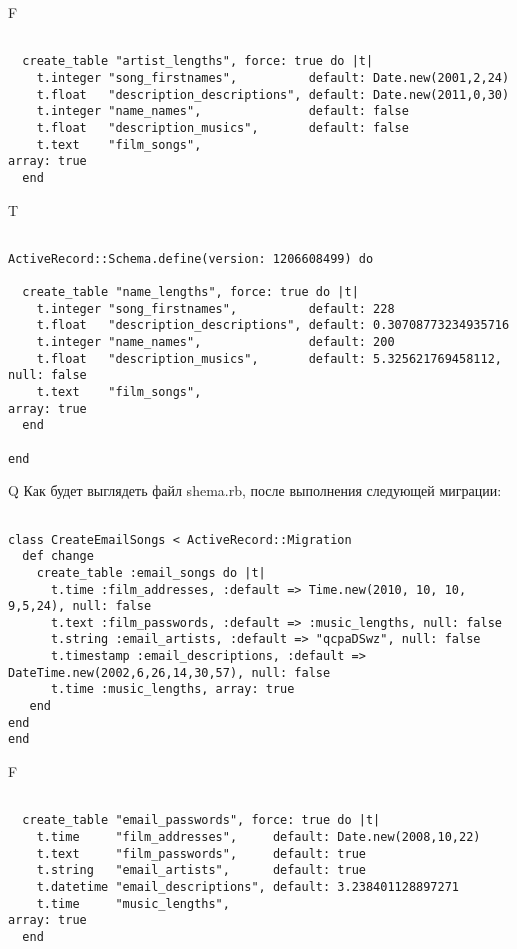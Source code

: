 F
\begin{verbatim}

  create_table "artist_lengths", force: true do |t|
    t.integer "song_firstnames",          default: Date.new(2001,2,24)
    t.float   "description_descriptions", default: Date.new(2011,0,30)
    t.integer "name_names",               default: false
    t.float   "description_musics",       default: false
    t.text    "film_songs",                                                          array: true
  end

\end{verbatim}

T
\begin{verbatim}

ActiveRecord::Schema.define(version: 1206608499) do

  create_table "name_lengths", force: true do |t|
    t.integer "song_firstnames",          default: 228
    t.float   "description_descriptions", default: 0.30708773234935716
    t.integer "name_names",               default: 200
    t.float   "description_musics",       default: 5.325621769458112,   null: false
    t.text    "film_songs",                                                          array: true
  end

end
\end{verbatim}

Q
Как будет выглядеть файл shema.rb, после выполнения следующей миграции:

\begin{verbatim}

class CreateEmailSongs < ActiveRecord::Migration 
  def change 
    create_table :email_songs do |t| 
      t.time :film_addresses, :default => Time.new(2010, 10, 10, 9,5,24), null: false
      t.text :film_passwords, :default => :music_lengths, null: false
      t.string :email_artists, :default => "qcpaDSwz", null: false
      t.timestamp :email_descriptions, :default => DateTime.new(2002,6,26,14,30,57), null: false
      t.time :music_lengths, array: true
   end
end
end
\end{verbatim}

F
\begin{verbatim}

  create_table "email_passwords", force: true do |t|
    t.time     "film_addresses",     default: Date.new(2008,10,22)
    t.text     "film_passwords",     default: true
    t.string   "email_artists",      default: true
    t.datetime "email_descriptions", default: 3.238401128897271
    t.time     "music_lengths",                                                   array: true
  end

\end{verbatim}

